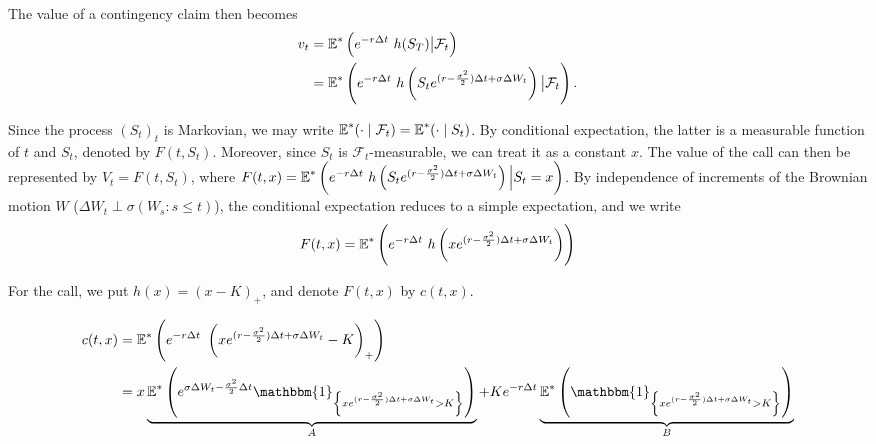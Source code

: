 The value of a contingency claim then becomes
\begin{align*}
	v_t  &=  \operatorname{\mathbb{E}}^* \left( e^{-r \Delta t} \  h(S_T)  \big|  \mathcal{F}_t \right)  \\
	     &=  \operatorname{\mathbb{E}}^* \left( e^{-r \Delta t} \  h \left(S_t e^{ ( r - \frac{\sigma^2}{2} ) \Delta t + \sigma \Delta W_t } \right)  \big|  \mathcal{F}_t \right) .
\end{align*}

Since the process $ (S_t)_t $ is Markovian, we may write $ \operatorname{\mathbb{E}}^*(\cdot \mid \mathcal{F}_t) = \operatorname{\mathbb{E}}^*(\cdot \mid S_t) $. By conditional expectation, the latter is a measurable function of $ t $ and $ S_t $, denoted by $ F(t, S_t) $. Moreover, since $ S_t $ is $ \mathcal{F}_t $-measurable, we can treat it as a constant $ x $. The value of the call can then be represented by $ V_t = F(t, S_t) $, where $ F(t,x) = \operatorname{\mathbb{E}}^* \left( e^{-r \Delta t} \  h \left( S_t e^{ ( r - \frac{\sigma^2}{2} ) \Delta t + \sigma \Delta W_t } \right)  \Big|  S_t = x \right) $. By independence of increments of the Brownian motion $ W $ ($ \Delta W_t \perp \sigma(W_s : s \le t) $), the conditional expectation reduces to a simple expectation, and we write
\begin{equation*}
	F(t, x)  =  \operatorname{\mathbb{E}}^* \left( e^{-r \Delta t} \  h \left( x e^{ ( r - \frac{\sigma^2}{2} ) \Delta t + \sigma \Delta W_t } \right) \right)
\end{equation*}

For the call, we put $ h(x) = (x - K)_+ $, and denote $ F(t, x) $ by $ c(t, x) $.

\begin{align*}
	c(t, x)  &=  \E^* \left( e^{-r \Delta t} \  \left( x e^{ ( r - \frac{\sigma^2}{2} ) \Delta t + \sigma \Delta W_t } - K  \right)_+  \right)  \\
	&=  x \underbrace{ \E^* \left( e^{ \sigma \Delta W_t - \frac{\sigma^2}{2} \Delta t }  \mathbbm{1}_{ \left\lbrace  x e^{ ( r - \frac{\sigma^2}{2} ) \Delta t + \sigma \Delta W_t } > K  \right\rbrace }  \right) }_{A}  +  K e^{-r \Delta t}  \underbrace{ \E^* \left(  \mathbbm{1}_{ \left\lbrace  x e^{ ( r - \frac{\sigma^2}{2} ) \Delta t + \sigma \Delta W_t } > K  \right\rbrace }  \right) }_{B}
\end{align*}

